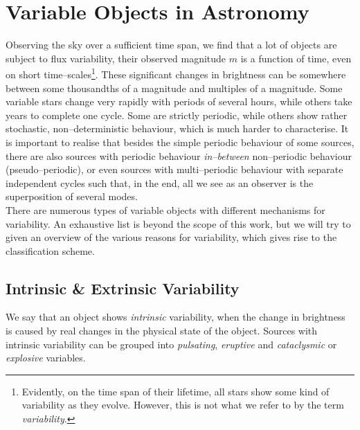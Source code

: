 \section{Variable Objects in Astronomy}
\label{sec:theory-variable-objects}

Observing the sky over a sufficient time span, we find that a lot of objects are subject to flux variability, \ie their observed magnitude $m$ is a function of time, even on short time--scales\footnote{Evidently, on the time span of their lifetime, all stars show some kind of variability as they evolve. However, this is not what we refer to by the term \emph{variability}.}. These significant changes in brightness can be somewhere between some thousandths of a magnitude and multiples of a magnitude. Some variable stars change very rapidly with periods of several hours, while others take years to complete one cycle. Some are strictly periodic, while others show rather stochastic, non--deterministic behaviour, which is much harder to characterise. It is important to realise that besides the simple periodic behaviour of some sources, there are also sources with periodic behaviour \emph{in--between} non--periodic behaviour (pseudo--periodic), or even sources with multi--periodic behaviour with separate independent cycles \citep{hanslmeier2007} such that, in the end, all we see as an observer is the superposition of several modes.\\

There are numerous types of variable objects with different mechanisms for variability. An exhaustive list is beyond the scope of this work, but we will try to given an overview of the various reasons for variability, which gives rise to the classification scheme.

\subsection{Intrinsic \& Extrinsic Variability}
\label{subsec:intrinsic-extrinsic-variability}

We say that an object shows \emph{intrinsic} variability, when the change in brightness is caused by real changes in the physical state of the object. Sources with intrinsic variability can be grouped into \emph{pulsating}, \emph{eruptive} and \emph{cataclysmic} or \emph{explosive} variables.

